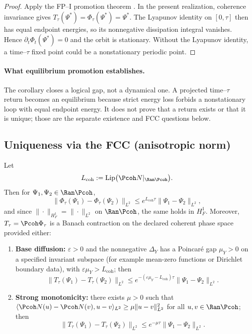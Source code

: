\documentclass[11pt]{article}
\newcommand{\HoneF}{\ensuremath{H^{1}_{F}}}
\newcommand{\Ltwo}{\ensuremath{L^{2}}}
\newcommand{\Lcoh}{L_{\mathrm{coh}}}
\begin{document}
\begin{proof}
Apply the FP--I promotion theorem \cite{Nero2025FP1}. In the present
realization, coherence invariance gives
$T_\tau(\Psi^\ast)=\Phi_\tau(\Psi^\ast)=\Psi^\ast$. The Lyapunov identity on
$[0,\tau]$ then has equal endpoint energies, so its nonnegative dissipation
integral vanishes. Hence $\partial_t\Phi_t(\Psi^\ast)=0$ and the orbit is
stationary. Without the Lyapunov identity, a time--$\tau$ fixed point could be
a nonstationary periodic point.
\end{proof}

\paragraph{What equilibrium promotion establishes.}
The corollary closes a logical gap, not a dynamical one.  A projected
time--$\tau$ return becomes an equilibrium because strict energy loss forbids
a nonstationary loop with equal endpoint energy.  It does not prove that a
return exists or that it is unique; those are the separate existence and FCC
questions below.

\subsection{Uniqueness via the FCC (anisotropic norm)}
\begin{theorem}\label{thm:FCC}
Let
\[
\Lcoh := \mathrm{Lip}\bigl(\Pcoh N|_{\Ran \Pcoh}\bigr).
\]
Then for $\Psi_1,\Psi_2\in\Ran\Pcoh$,
\[
\|\Phi_\tau(\Psi_1)-\Phi_\tau(\Psi_2)\|_{\Ltwo}
\le e^{\Lcoh\tau}\|\Psi_1-\Psi_2\|_{\Ltwo},
\]
and since $\|\cdot\|_{\HoneF}=\|\cdot\|_{\Ltwo}$ on $\Ran\Pcoh$, the same holds in $\HoneF$.
Moreover, $T_\tau=\Pcoh\Phi_\tau$ is a Banach contraction on the declared
coherent phase space provided either:
\begin{enumerate}[label=\textup{(\alph*)}]
\item \textbf{Base diffusion:} $\varepsilon>0$ and the nonnegative
      $\Delta_Y$ has a Poincar\'e gap $\mu_Y>0$ on a specified invariant
      subspace (for example mean-zero functions or Dirichlet boundary data), with
      $\varepsilon\mu_Y>\Lcoh$; then
      \[
      \|T_\tau(\Psi_1)-T_\tau(\Psi_2)\|_{\Ltwo}\le e^{-(\varepsilon\mu_Y-\Lcoh)\tau}\|\Psi_1-\Psi_2\|_{\Ltwo}.
      \]
\item \textbf{Strong monotonicity:} there exists $\mu>0$ such that
      $\langle \Pcoh N(u)-\Pcoh N(v),u-v\rangle_{\Ltwo}\ge \mu\|u-v\|_{\Ltwo}^2$
      for all $u,v\in\Ran\Pcoh$; then
      \[
      \|T_\tau(\Psi_1)-T_\tau(\Psi_2)\|_{\Ltwo}\le e^{-\mu\tau}\|\Psi_1-\Psi_2\|_{\Ltwo}.
      \]
\end{enumerate}
\end{theorem}
\end{document}
